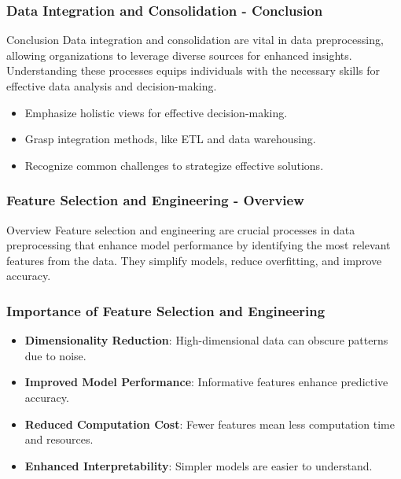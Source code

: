 \documentclass[aspectratio=169]{beamer}
\begin{document}
\begin{frame}[fragile]
    \frametitle{Data Integration and Consolidation - Conclusion}
    \begin{block}{Conclusion}
        Data integration and consolidation are vital in data preprocessing, allowing organizations to leverage diverse sources for enhanced insights. Understanding these processes equips individuals with the necessary skills for effective data analysis and decision-making.
    \end{block}
    \begin{itemize}
        \item Emphasize holistic views for effective decision-making.
        \item Grasp integration methods, like ETL and data warehousing.
        \item Recognize common challenges to strategize effective solutions.
    \end{itemize}
\end{frame}

\begin{frame}[fragile]
    \frametitle{Feature Selection and Engineering - Overview}
    \begin{block}{Overview}
        Feature selection and engineering are crucial processes in data preprocessing that enhance model performance by identifying the most relevant features from the data. They simplify models, reduce overfitting, and improve accuracy.
    \end{block}
\end{frame}

\begin{frame}[fragile]
    \frametitle{Importance of Feature Selection and Engineering}
    \begin{itemize}
        \item \textbf{Dimensionality Reduction}: High-dimensional data can obscure patterns due to noise.
        \item \textbf{Improved Model Performance}: Informative features enhance predictive accuracy.
        \item \textbf{Reduced Computation Cost}: Fewer features mean less computation time and resources.
        \item \textbf{Enhanced Interpretability}: Simpler models are easier to understand.
    \end{itemize}
\end{frame}
\end{document}
